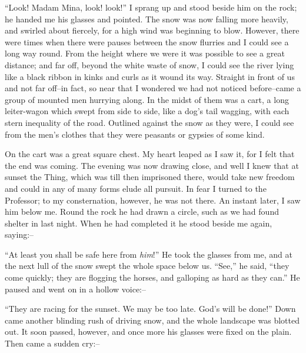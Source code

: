 \documentclass[12pt,openright]{book}
\begin{document}
“Look! Madam Mina, look! look!” I sprang up and stood beside him on the rock; he handed me his glasses and pointed. The snow was now falling more heavily, and swirled about fiercely, for a high wind was beginning to blow. However, there were times when there were pauses between the snow flurries and I could see a long way round. From the height where we were it was possible to see a great distance; and far off, beyond the white waste of snow, I could see the river lying like a black ribbon in kinks and curls as it wound its way. Straight in front of us and not far off–in fact, so near that I wondered we had not noticed before–came a group of mounted men hurrying along. In the midst of them was a cart, a long leiter-wagon which swept from side to side, like a dog’s tail wagging, with each stern inequality of the road. Outlined against the snow as they were, I could see from the men’s clothes that they were peasants or gypsies of some kind.

On the cart was a great square chest. My heart leaped as I saw it, for I felt that the end was coming. The evening was now drawing close, and well I knew that at sunset the Thing, which was till then imprisoned there, would take new freedom and could in any of many forms elude all pursuit. In fear I turned to the Professor; to my consternation, however, he was not there. An instant later, I saw him below me. Round the rock he had drawn a circle, such as we had found shelter in last night. When he had completed it he stood beside me again, saying:–

“At least you shall be safe here from \textit{him}!” He took the glasses from me, and at the next lull of the snow swept the whole space below us. “See,” he said, “they come quickly; they are flogging the horses, and galloping as hard as they can.” He paused and went on in a hollow voice:–

“They are racing for the sunset. We may be too late. God’s will be done!” Down came another blinding rush of driving snow, and the whole landscape was blotted out. It soon passed, however, and once more his glasses were fixed on the plain. Then came a sudden cry:–
\end{document}
